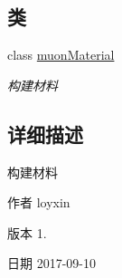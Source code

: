 \subsection*{类}
\begin{DoxyCompactItemize}
\item 
class \hyperlink{classmuonMaterial}{muon\+Material}
\begin{DoxyCompactList}\small\item\em 构建材料 \end{DoxyCompactList}\end{DoxyCompactItemize}


\subsection{详细描述}
构建材料 

\begin{DoxyAuthor}{作者}
loyxin 
\end{DoxyAuthor}
\begin{DoxyVersion}{版本}
1. 
\end{DoxyVersion}
\begin{DoxyDate}{日期}
2017-\/09-\/10 
\end{DoxyDate}
